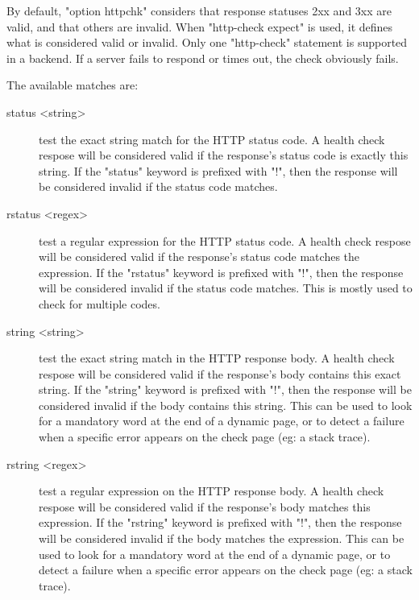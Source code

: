   By default, "option httpchk" considers that response statuses 2xx and 3xx
  are valid, and that others are invalid. When "http-check expect" is used,
  it defines what is considered valid or invalid. Only one "http-check"
  statement is supported in a backend. If a server fails to respond or times
  out, the check obviously fails.
  
  The available matches are:
  \begin{description}
  \item[status <string>] test the exact string match for the HTTP status code.
                      A health check respose will be considered valid if the
                      response's status code is exactly this string. If the
                      "status" keyword is prefixed with "!", then the response
                      will be considered invalid if the status code matches.

    \item[rstatus <regex>] test a regular expression for the HTTP status code.
                      A health check respose will be considered valid if the
                      response's status code matches the expression. If the
                      "rstatus" keyword is prefixed with "!", then the response
                      will be considered invalid if the status code matches.
                      This is mostly used to check for multiple codes.

    \item[string <string>] test the exact string match in the HTTP response body.
                      A health check respose will be considered valid if the
                      response's body contains this exact string. If the
                      "string" keyword is prefixed with "!", then the response
                      will be considered invalid if the body contains this
                      string. This can be used to look for a mandatory word at
                      the end of a dynamic page, or to detect a failure when a
                      specific error appears on the check page (eg: a stack
                      trace).

    \item[rstring <regex>] test a regular expression on the HTTP response body.
                      A health check respose will be considered valid if the
                      response's body matches this expression. If the "rstring"
                      keyword is prefixed with "!", then the response will be
                      considered invalid if the body matches the expression.
                      This can be used to look for a mandatory word at the end
                      of a dynamic page, or to detect a failure when a specific
                      error appears on the check page (eg: a stack trace).
  \end{description}

